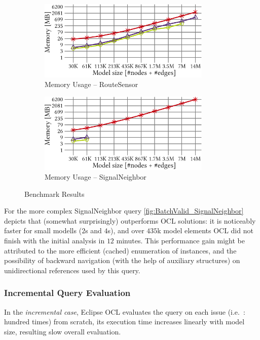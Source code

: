 \begin{figure}[ht]
\begin{center}
	\begin{subfigure}[t]{0.48\textwidth}\centering
	    \includegraphics[width=0.9\textwidth]{figures/trainBenchmark_User_Memory_RouteSensor}
	    \caption{Memory Usage -- RouteSensor}
	    \label{fig:Memory_RouteSensor}
	\end{subfigure}
	\begin{subfigure}[t]{0.48\textwidth}\centering
	    \includegraphics[width=0.9\textwidth]{figures/trainBenchmark_User_Memory_SignalNeighbor}
	    \caption{Memory Usage -- SignalNeighbor}
	    \label{fig:Memory_SignalNeighbor}
	\end{subfigure}
  \caption{Benchmark Results}
  \label{fig:trainbenchmark-diagrams}
\end{center}
\end{figure}

For the more complex \textsf{SignalNeighbor} query
\autoref{fig:BatchValid_SignalNeighbor} depicts that \incquery{} (somewhat
surprisingly) outperforms OCL solutions: it is noticeably faster for small
modells ($2$s and $4$s), and over $435$k model elements OCL did not finish with
the initial analysis in $12$ minutes. This performance gain might be attributed to
the more efficient (cached) enumeration of instances, and the possibility of
backward navigation (with the help of auxiliary structures) on unidirectional
references used by this query.

\subsubsection{Incremental Query Evaluation}
In the \emph{incremental case}, Eclipse OCL evaluates the query on each issue
(i.e.\ : hundred times) from scratch, its execution time increases linearly with
model size, resulting slow overall evaluation.


